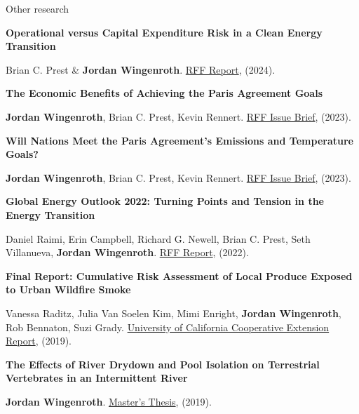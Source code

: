 \documentclass{resume} %
\begin{document}
\begin{rSection}{Other research}

{\bf Operational versus Capital Expenditure Risk in a Clean Energy Transition}
\vspace{-7pt}
\begin{adjustwidth}{12pt}{}
{\small Brian C. Prest \& \textbf{Jordan Wingenroth}. \href{https://www.rff.org/publications/reports/operational-versus-capital-expenditure-risk-in-a-clean-energy-transition/}{RFF Report}, (2024).}
\end{adjustwidth}

{\bf The Economic Benefits of Achieving the Paris Agreement Goals}
\vspace{-7pt}
\begin{adjustwidth}{12pt}{}
{\small \textbf{Jordan Wingenroth}, Brian C. Prest, Kevin Rennert. \href{https://www.rff.org/publications/issue-briefs/the-economic-benefits-of-achieving-the-paris-agreement-goals/}{RFF Issue Brief}, (2023).}
\end{adjustwidth}

{\bf Will Nations Meet the Paris Agreement's Emissions and Temperature Goals?}
\vspace{-7pt}
\begin{adjustwidth}{12pt}{}
{\small \textbf{Jordan Wingenroth}, Brian C. Prest, Kevin Rennert. \href{https://www.rff.org/publications/issue-briefs/will-nations-meet-the-paris-agreements-emissions-and-temperature-goals/}{RFF Issue Brief}, (2023).}
\end{adjustwidth}

{\bf Global Energy Outlook 2022: Turning Points and Tension in the Energy Transition}
\vspace{-7pt}
\begin{adjustwidth}{12pt}{}
{\small Daniel Raimi, Erin Campbell, Richard G. Newell, Brian C. Prest, Seth Villanueva, \textbf{Jordan Wingenroth}. \href{https://www.rff.org/publications/reports/global-energy-outlook-2022/}{RFF Report}, (2022).}
\end{adjustwidth}

{\bf Final Report: Cumulative Risk Assessment of Local Produce Exposed to Urban Wildfire Smoke}
\vspace{-7pt}
\begin{adjustwidth}{12pt}{}
{\small Vanessa Raditz, Julia Van Soelen Kim, Mimi Enright, \textbf{Jordan Wingenroth}, Rob Bennaton, Suzi Grady. \href{https://ucanr.edu/sites/SoCo/files/308873.pdf}{University of California Cooperative Extension Report}, (2019).}
\end{adjustwidth}

{\bf The Effects of River Drydown and Pool Isolation on Terrestrial Vertebrates in an Intermittent River}
\vspace{-7pt}
\begin{adjustwidth}{12pt}{}
{\small \textbf{Jordan Wingenroth}. \href{https://digicoll.lib.berkeley.edu/record/140194?ln=en}{Master's Thesis}, (2019).}
\end{adjustwidth}

\end{rSection}
\end{document}
